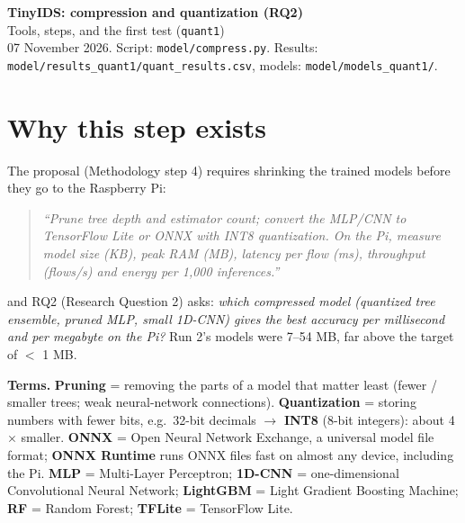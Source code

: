 \documentclass[11pt]{article}
\begin{document}
{\LARGE\bfseries TinyIDS: compression and quantization (RQ2)}\\[4pt]
{\large Tools, steps, and the first test (\texttt{quant1})}\\[2pt]
07 November 2026. Script: \texttt{model/compress.py}. Results: \texttt{model/results\_quant1/quant\_results.csv}, models: \texttt{model/models\_quant1/}.

\tableofcontents

\newpage
\section{Why this step exists}
The proposal (Methodology step 4) requires shrinking the trained models before they go to the Raspberry Pi:
\begin{quote}\itshape
``Prune tree depth and estimator count; convert the MLP/CNN to TensorFlow Lite or ONNX with INT8 quantization. On the Pi, measure model size (KB),
peak RAM (MB), latency per flow (ms), throughput (flows/s) and energy per 1,000 inferences.''
\end{quote}
and RQ2 (Research Question 2) asks: \emph{which compressed model (quantized tree ensemble, pruned MLP, small 1D-CNN) gives the best accuracy per
millisecond and per megabyte on the Pi?} Run 2's models were 7--54 MB, far above the target of $<$ 1 MB.

\textbf{Terms.}
\textbf{Pruning} = removing the parts of a model that matter least (fewer / smaller trees; weak neural-network connections).
\textbf{Quantization} = storing numbers with fewer bits, e.g.\ 32-bit decimals $\rightarrow$ \textbf{INT8} (8-bit integers): about 4$\times$ smaller.
\textbf{ONNX} = Open Neural Network Exchange, a universal model file format; \textbf{ONNX Runtime} runs ONNX files fast on almost any device, including the Pi.
\textbf{MLP} = Multi-Layer Perceptron; \textbf{1D-CNN} = one-dimensional Convolutional Neural Network;
\textbf{LightGBM} = Light Gradient Boosting Machine; \textbf{RF} = Random Forest; \textbf{TFLite} = TensorFlow Lite.

\end{document}
